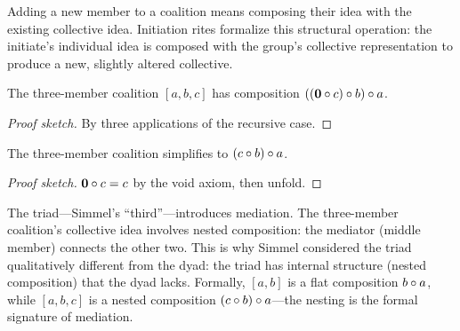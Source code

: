 Adding a new member to a coalition means composing their idea with the
existing collective idea.  Initiation rites formalize this structural
operation: the initiate's individual idea is composed with the group's
collective representation to produce a new, slightly altered collective.

\begin{theorem}
\label{thm:three-member}
The three-member coalition $[a, b, c]$ has composition
$((\mathbf{0} \circ c) \circ b) \circ a$.
\end{theorem}

\begin{proof}[Proof sketch]
By three applications of the recursive case.
\end{proof}

\begin{theorem}
\label{thm:three-member-simp}
The three-member coalition simplifies to $(c \circ b) \circ a$.
\end{theorem}

\begin{proof}[Proof sketch]
$\mathbf{0} \circ c = c$ by the void axiom, then unfold.
\end{proof}

The triad---Simmel's ``third''---introduces mediation.  The three-member
coalition's collective idea involves nested composition: the mediator
(middle member) connects the other two.  This is why Simmel considered the
triad qualitatively different from the dyad: the triad has internal
structure (nested composition) that the dyad lacks.  Formally, $[a, b]$
is a flat composition $b \circ a$, while $[a, b, c]$ is a nested
composition $(c \circ b) \circ a$---the nesting is the formal
signature of mediation.

